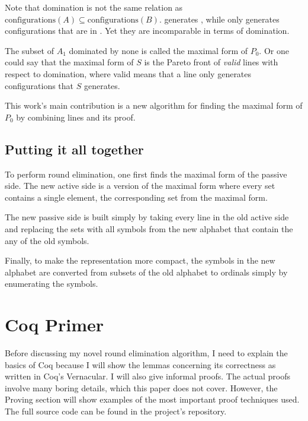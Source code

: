 \documentclass[english, 12pt, a4paper, sci, utf8, a-1b, online]{aaltothesis}
\begin{document}
Note that domination is not the same relation as $\text{configurations}(A) \subseteq \text{configurations}(B)$.  generates , while  only generates configurations that are in . Yet they are incomparable in terms of domination.

The subset of $A_{1}$ dominated by none is called the maximal form of $P_{0}$. Or one could say that the maximal form of $S$ is the Pareto front of \emph{valid} lines with respect to domination, where valid means that a line only generates configurations that $S$ generates.

This work's main contribution is a new algorithm for finding the maximal form of $P_{0}$ by combining lines and its proof.


\subsection{Putting it all together}

To perform round elimination, one first finds the maximal form of the passive side. The new active side is a version of the maximal form where every set contains a single element, the corresponding set from the maximal form.

The new passive side is built simply by taking every line in the old active side and replacing the sets with all symbols from the new alphabet that contain the any of the old symbols.

Finally, to make the representation more compact, the symbols in the new alphabet are converted from subsets of the old alphabet to ordinals simply by enumerating the symbols.

\section{Coq Primer}

Before discussing my novel round elimination algorithm, I need to explain the basics of Coq because I will show the lemmas concerning its correctness as written in Coq's Vernacular. I will also give informal proofs. The actual proofs involve many boring details, which this paper does not cover. However, the Proving section will show examples of the most important proof techniques used. The full source code can be found in the project's repository\cite{source_code}.
\end{document}
